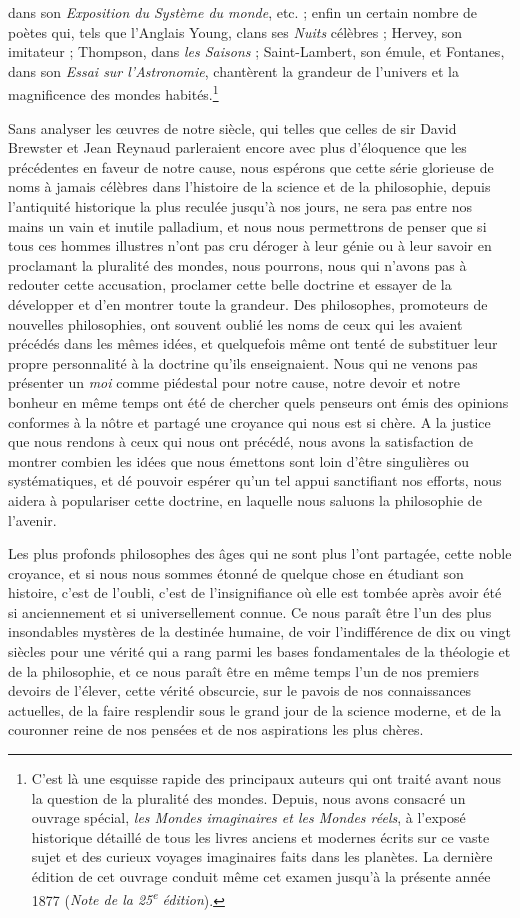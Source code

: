 \documentclass[a4paper, 11pt, oneside]{article}
\begin{document}
dans son \emph{Exposition du Système du monde}, etc. ; enfin un certain nombre de poètes qui, tels que l'Anglais Young, clans ses \emph{Nuits} célèbres ; Hervey, son imitateur ; Thompson, dans \emph{les Saisons} ; Saint-Lambert, son émule, et Fontanes, dans son \emph{Essai sur l'Astronomie}, chantèrent la grandeur de l'univers et la magnificence des mondes habités.\footnote{C'est là une esquisse rapide des principaux auteurs qui ont traité avant nous la question de la pluralité des mondes. Depuis, nous avons consacré un ouvrage spécial, \emph{les Mondes imaginaires et les Mondes réels}, à l'exposé historique détaillé de tous les livres anciens et modernes écrits sur ce vaste sujet et des curieux voyages imaginaires faits dans les planètes. La dernière édition de cet ouvrage conduit même cet examen jusqu'à la présente année 1877 (\emph{Note de la 25\textsuperscript{e} édition}).}

Sans analyser les œuvres de notre siècle, qui telles que celles de sir David Brewster et Jean Reynaud parleraient encore avec plus d'éloquence que les précédentes en faveur de notre cause, nous espérons que cette série glorieuse de noms à jamais célèbres dans l'histoire de la science et de la philosophie, depuis l'antiquité historique la plus reculée jusqu'à nos jours, ne sera pas entre nos mains un vain et inutile palladium, et nous nous permettrons de penser que si tous ces hommes illustres n'ont pas cru déroger à leur génie ou à leur savoir en proclamant la pluralité des mondes, nous pourrons, nous qui n'avons pas à redouter cette accusation, proclamer cette belle doctrine et essayer de la développer et d'en montrer toute la grandeur. Des philosophes, promoteurs de nouvelles philosophies, ont souvent oublié les noms de ceux qui les avaient précédés dans les mêmes idées, et quelquefois même ont tenté de substituer leur propre personnalité à la doctrine qu'ils enseignaient. Nous qui ne venons pas présenter un \emph{moi} comme piédestal pour notre cause, notre devoir et notre bonheur en même temps ont été de chercher quels penseurs ont émis des opinions conformes à la nôtre et partagé une croyance qui nous est si chère. A la justice que nous rendons à ceux qui nous ont précédé, nous avons la satisfaction de montrer combien les idées que nous émettons sont loin d'être singulières ou systématiques, et dé pouvoir espérer qu'un tel appui sanctifiant nos efforts, nous aidera à populariser cette doctrine, en laquelle nous saluons la philosophie de l'avenir.

Les plus profonds philosophes des âges qui ne sont plus l'ont partagée, cette noble croyance, et si nous nous sommes étonné de quelque chose en étudiant son histoire, c'est de l'oubli, c'est de l'insignifiance où elle est tombée après avoir été si anciennement et si universellement connue. Ce nous paraît être l'un des plus insondables mystères de la destinée humaine, de voir l'indifférence de dix ou vingt siècles pour une vérité qui a rang parmi les bases fondamentales de la théologie et de la philosophie, et ce nous paraît être en même temps l'un de nos premiers devoirs de l'élever, cette vérité obscurcie, sur le pavois de nos connaissances actuelles, de la faire resplendir sous le grand jour de la science moderne, et de la couronner reine de nos pensées et de nos aspirations les plus chères.
\end{document}
